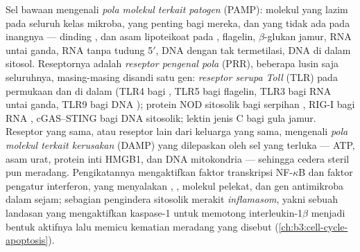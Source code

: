\begin{definition}\label{def:b3:innate-immunity:prr}
%
%
Sel bawaan mengenali \emph{pola molekul terkait patogen}
(PAMP): molekul yang lazim pada seluruh kelas mikroba, yang penting bagi
mereka, dan yang tidak ada pada inangnya ---  dinding
,  dan asam lipoteikoat pada ,
flagelin, $\beta$-glukan jamur, RNA untai ganda, RNA tanpa
tudung 5$'$, DNA dengan  tak termetilasi, DNA di dalam sitosol. Reseptornya
adalah \emph{reseptor pengenal pola} (PRR), beberapa lusin saja seluruhnya,
masing-masing disandi satu gen: \emph{reseptor serupa Toll} (TLR) pada
permukaan dan di dalam  (TLR4 bagi , TLR5 bagi
flagelin, TLR3 bagi RNA untai ganda, TLR9 bagi DNA ); protein
NOD sitosolik bagi serpihan , RIG-I bagi RNA
, cGAS--STING bagi DNA sitosolik; lektin jenis C bagi gula jamur.
Reseptor yang sama, atau reseptor lain dari keluarga yang sama, mengenali
\emph{pola molekul terkait kerusakan} (DAMP) yang dilepaskan oleh sel
yang terluka --- ATP, asam urat, protein inti HMGB1, dan DNA
mitokondria --- sehingga cedera steril pun meradang. Pengikatannya mengaktifkan
faktor transkripsi NF-$\kappa$B dan faktor pengatur interferon,
yang menyalakan , , molekul pelekat, dan
gen antimikroba dalam sejam; sebagian pengindera sitosolik
merakit \emph{inflamasom}, yakni sebuah landasan yang mengaktifkan kaspase-1
untuk memotong interleukin-1$\beta$ menjadi bentuk aktifnya lalu memicu
kematian meradang yang disebut  (\cref{ch:b3:cell-cycle-apoptosis}).
\end{definition}


